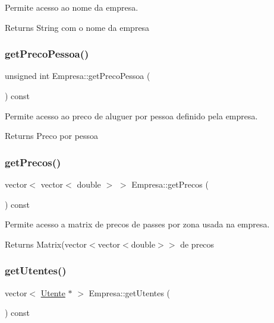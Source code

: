 Permite acesso ao nome da empresa. 

\begin{DoxyReturn}{Returns}
String com o nome da empresa 
\end{DoxyReturn}
\mbox{\label{class_empresa_a0c2b8d30106124c1eb34e82769337656}} 
\subsubsection{\texorpdfstring{get\+Preco\+Pessoa()}{getPrecoPessoa()}}
{\footnotesize\ttfamily unsigned int Empresa\+::get\+Preco\+Pessoa (\begin{DoxyParamCaption}{ }\end{DoxyParamCaption}) const}



Permite acesso ao preco de aluguer por pessoa definido pela empresa. 

\begin{DoxyReturn}{Returns}
Preco por pessoa 
\end{DoxyReturn}
\mbox{\label{class_empresa_a1b5f74cd32b847b36d39bba103e34f24}} 
\subsubsection{\texorpdfstring{get\+Precos()}{getPrecos()}}
{\footnotesize\ttfamily vector$<$ vector$<$ double $>$ $>$ Empresa\+::get\+Precos (\begin{DoxyParamCaption}{ }\end{DoxyParamCaption}) const}



Permite acesso a matrix de precos de passes por zona usada na empresa. 

\begin{DoxyReturn}{Returns}
Matrix(vector$<$vector$<$double$>$$>$ de precos 
\end{DoxyReturn}
\mbox{\label{class_empresa_a8eded445f1ae7289bb1ba77adb7c581e}} 
\subsubsection{\texorpdfstring{get\+Utentes()}{getUtentes()}}
{\footnotesize\ttfamily vector$<$ \mbox{\hyperlink{class_utente}{Utente}} $\ast$ $>$ Empresa\+::get\+Utentes (\begin{DoxyParamCaption}{ }\end{DoxyParamCaption}) const}



